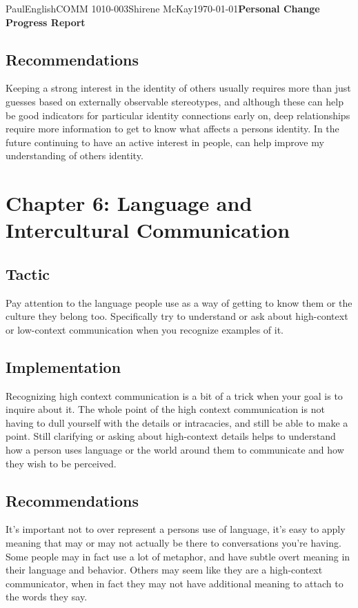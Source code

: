 \documentclass[12pt,letterpaper]{article}
\begin{document}
\begin{mla}{Paul}{English}{COMM 1010-003}{Shirene
    McKay}{\today}{\textbf{Personal Change Progress Report}}
\subsection{Recommendations}
Keeping a strong interest in the identity of others usually requires
more than just guesses based on externally observable stereotypes, and
although these can help be good indicators for particular identity
connections early on, deep relationships require more information to
get to know what affects a persons identity. In the future continuing
to have an active interest in people, can help improve my
understanding of others identity.

\section{Chapter 6: Language and Intercultural Communication}
\subsection{Tactic}
Pay attention to the language people use as a way of getting to know
them or the culture they belong too. Specifically try to understand or
ask about high-context or low-context communication when you recognize
examples of it.

\subsection{Implementation}
Recognizing high context communication is a bit of a trick when your
goal is to inquire about it. The whole point of the high context
communication is not having to dull yourself with the details or
intracacies, and still be able to make a point. Still clarifying or
asking about high-context details helps to understand how a person
uses language or the world around them to communicate and how they
wish to be perceived.

\subsection{Recommendations}
It's important not to over represent a persons use of language, it's
easy to apply meaning that may or may not actually be there to
conversations you're having. Some people may in fact use a lot of
metaphor, and have subtle overt meaning in their language and
behavior. Others may seem like they are a high-context communicator,
when in fact they may not have additional meaning to attach to the
words they say.


\end{mla}
\end{document}
